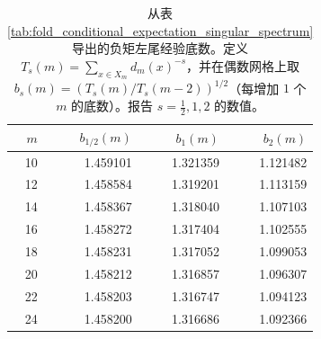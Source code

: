 \begin{table}[H]
\centering
\scriptsize
\setlength{\tabcolsep}{6pt}
\caption{从表 \ref{tab:fold_conditional_expectation_singular_spectrum} 导出的负矩左尾经验底数。定义 $T_s(m)=\sum_{x\in X_m}d_m(x)^{-s}$，并在偶数网格上取 $b_s(m)=(T_s(m)/T_s(m-2))^{1/2}$（每增加 $1$ 个 $m$ 的底数）。报告 $s=\tfrac12,1,2$ 的数值。}
\label{tab:fold_conditional_expectation_left_tail_bases}
\begin{tabular}{r r r r}
\toprule
$m$ & $b_{1/2}(m)$ & $b_{1}(m)$ & $b_{2}(m)$\\
\midrule
10 & 1.459101 & 1.321359 & 1.121482\\
12 & 1.458584 & 1.319201 & 1.113159\\
14 & 1.458367 & 1.318040 & 1.107103\\
16 & 1.458272 & 1.317404 & 1.102555\\
18 & 1.458231 & 1.317052 & 1.099053\\
20 & 1.458212 & 1.316857 & 1.096307\\
22 & 1.458203 & 1.316747 & 1.094123\\
24 & 1.458200 & 1.316686 & 1.092366\\
\bottomrule
\end{tabular}
\end{table}
